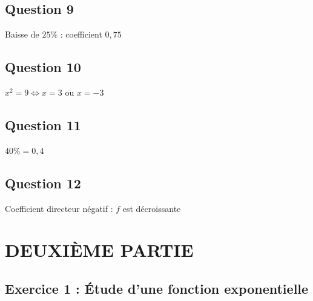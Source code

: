 \documentclass[a4paper,12pt]{article}
\begin{document}
\subsection*{Question 9}
Baisse de $25\%$ : coefficient $0,75$ \hfill {}

\subsection*{Question 10}
$x^2 = 9 \iff x = 3$ ou $x = -3$ \hfill {}

\subsection*{Question 11}
$40\% = 0,4$ \hfill {}

\subsection*{Question 12}
Coefficient directeur négatif : $f$ est décroissante \hfill {}

\newpage

\section*{DEUXIÈME PARTIE}

\subsection*{Exercice 1 : Étude d'une fonction exponentielle}
\end{document}

